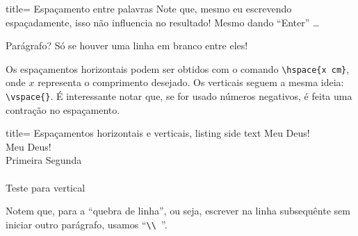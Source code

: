 \begin{tcblisting}{title= Espaçamento entre palavras}
  Note         que, mesmo        eu    escrevendo
  espaçadamente, isso não    influencia no
  resultado!
  Mesmo dando ``Enter'' \ldots
  
  Parágrafo? Só se houver uma linha em branco entre eles!
\end{tcblisting}

Os espaçamentos \textsf{horizontais} podem ser obtidos com o comando 
\Verb|\hspace{x cm}|, onde $x$ representa o comprimento desejado.
Os \textsf{verticais} seguem a mesma ideia: \Verb|\vspace{}|.
É interessante notar que, se for usado números negativos, é feita uma contração 
no espaçamento. 

\begin{tcblisting}{title= Espaçamentos horizontais e verticais, listing side text}
Meu \hspace{2cm} Deus!\\
Meu \hspace{-0.5cm} Deus!\\
Primeira \hfill Segunda\\
\vspace*{0.7cm}\\
Teste para vertical
\end{tcblisting}  

Notem que, para a ``quebra de linha'', ou seja, escrever na linha subsequênte sem
iniciar outro parágrafo, usamos ``\Verb|\\ |''.